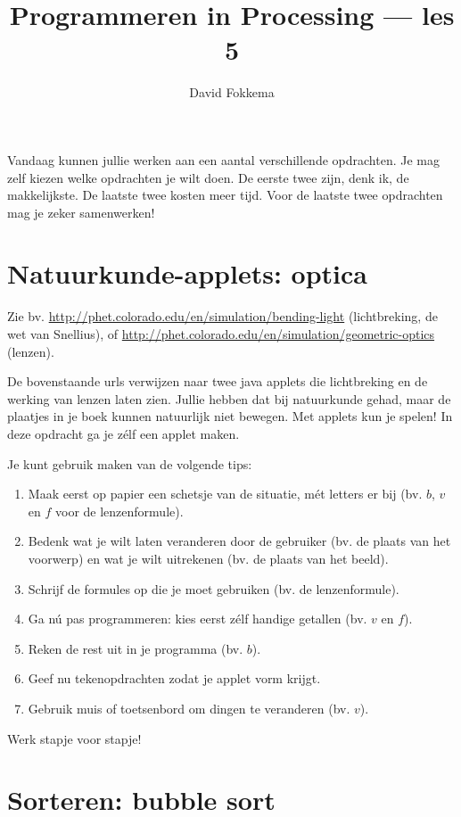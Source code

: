 \documentclass[a4paper,11pt]{article}
\title{Programmeren in Processing --- les 5}
\author{David Fokkema}
\begin{document}
\maketitle

Vandaag kunnen jullie werken aan een aantal verschillende opdrachten.  Je mag zelf kiezen welke opdrachten je wilt doen.  De eerste twee zijn, denk ik, de makkelijkste.  De laatste twee kosten meer tijd.  Voor de laatste twee opdrachten mag je zeker samenwerken!

\section{Natuurkunde-applets: optica}

Zie bv. \url{http://phet.colorado.edu/en/simulation/bending-light} (lichtbreking, de wet van Snellius), of \url{http://phet.colorado.edu/en/simulation/geometric-optics} (lenzen).

De bovenstaande urls verwijzen naar twee java applets die lichtbreking en de werking van lenzen laten zien.  Jullie hebben dat bij natuurkunde gehad, maar de plaatjes in je boek kunnen natuurlijk niet bewegen.  Met applets kun je spelen!  In deze opdracht ga je zélf een applet maken.

Je kunt gebruik maken van de volgende tips:
\begin{enumerate}
    \item Maak eerst op papier een schetsje van de situatie, mét letters er bij (bv. $b$, $v$ en $f$ voor de lenzenformule).
    \item Bedenk wat je wilt laten veranderen door de gebruiker (bv. de plaats van het voorwerp) en wat je wilt uitrekenen (bv. de plaats van het beeld).
    \item Schrijf de formules op die je moet gebruiken (bv. de lenzenformule).
    \item Ga nú pas programmeren: kies eerst zélf handige getallen (bv. $v$ en $f$).
    \item Reken de rest uit in je programma (bv. $b$).
    \item Geef nu tekenopdrachten zodat je applet vorm krijgt.
    \item Gebruik muis of toetsenbord om dingen te veranderen (bv. $v$).
\end{enumerate}
Werk stapje voor stapje!


\section{Sorteren: bubble sort}
\end{document}
